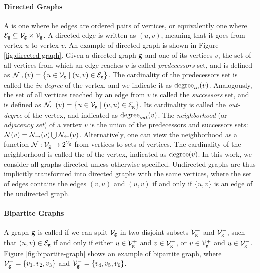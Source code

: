 \paragraph{Directed Graphs}
A  is one where he edges are ordered pairs of vertices, or equivalently one where $\Edges{g}\subseteq \Nodes{g}\times \Nodes{g}$. A directed edge is written as $(u, v)$, meaning that it goes from vertex $u$ to vertex $v$. An example of directed graph is shown in Figure \ref{fig:directed-graph}. Given a directed graph $\mathtt{g}$ and one of its vertices $v$, the set of all vertices from which an edge reaches $v$ is called \emph{predecessors} set, and is defined as $\Pred(v) = \Set{u \in \Nodes{g} \mid (u,v) \in \Edges{g}}$. The cardinality of the predecessors set is called the \emph{in-degree} of the vertex, and we indicate it as $\mathrm{degree}_{in}(v)$. Analogously, the set of all vertices reached by an edge from $v$ is called the \emph{successors} set, and is defined as $\Succ(v) = \Set{u \in \Nodes{g}\mid (v,u) \in \Edges{g}}$. Its cardinality is called the \emph{out-degree} of the vertex, and indicated as $\mathrm{degree}_{out}(v)$. The \emph{neighborhood} (or \emph{adjacency set}) of a vertex $v$ is the union of the predecessors and successors sets: $\Neigh(v) = \Pred(v) \bigcup \Succ(v)$. Alternatively, one can view the neighborhood as a function $\Neigh: \Nodes{g}\shortrightarrow 2^{\Nodes{g}}$ from vertices to sets of vertices. The cardinality of the neighborhood is called the  of the vertex, indicated as $\mathrm{degree}(v)$.  In this work, we consider all graphs directed unless otherwise specified. Undirected graphs are thus implicitly transformed into directed graphs with the same vertices, where the set of edges contains the edges $(v,u)$ and $(u,v)$ if and only if $\{u,v\}$ is an edge of the undirected graph.

\paragraph{Bipartite Graphs}
A graph $\mathtt{g}$ is called  if we can split $\Nodes{g}$ in two disjoint subsets $\Nodes{g}^{+}$ and $\Nodes{g}^{-}$, such that $(u, v) \in \Edges{g}$ if and only if either $u \in \Nodes{g}^{+}$ and $v \in \Nodes{g}^{-}$, or $v \in \Nodes{g}^{+}$ and $u \in \Nodes{g}^{-}$. Figure \ref{fig:bipartite-graph} shows an example of bipartite graph, where
$\Nodes{g}^{+} = \Set{v_1, v_2, v_3}$ and $\Nodes{g}^{-} = \Set{v_4, v_5, v_6}$.


